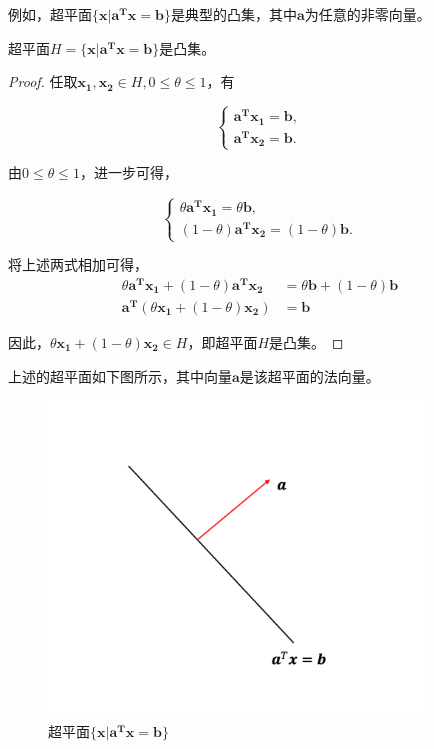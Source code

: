 例如，超平面$\{\bm{x}|\bm{a^{T}}\bm{x}=\bm{b}\}$是典型的凸集，其中$\bm{a}$为任意的非零向量。

\begin{problem}
    超平面$H=\{\bm{x}|\bm{a^{T}}\bm{x}=\bm{b}\}$是凸集。
\end{problem}
\begin{proof}
    任取$\bm{x_{1}}, \bm{x_{2}}\in H, 0 \leq \theta \leq 1$，有
    
    \begin{equation*}
        \begin{cases}
            \bm{a^{T}x_{1}} = \bm{b}, \\
            \bm{a^{T}x_{2}} = \bm{b}.
        \end{cases}
    \end{equation*}

    由$0\leq \theta \leq 1$，进一步可得，
    
    \begin{equation*}
        \begin{cases}
            \theta \bm{a^{T}x_{1}} = \theta \bm{b}, \\
            (1-\theta) \bm{a^{T}x_{2}} = (1-\theta) \bm{b}.
        \end{cases}
    \end{equation*}

    将上述两式相加可得，
    \begin{equation*}
        \begin{split}
            \theta \bm{a^{T}x_{1}} + (1-\theta) \bm{a^{T}x_{2}} &= \theta \bm{b} + (1-\theta) \bm{b} \\
            \bm{a^{T}} (\theta \bm{x_{1}}+(1-\theta)\bm{x_{2}}) &= \bm{b}
        \end{split}
    \end{equation*}

    因此，$\theta \bm{x_{1}}+(1-\theta)\bm{x_{2}} \in H$，即超平面$H$是凸集。
\end{proof}

上述的超平面如下图所示，其中向量$\bm{a}$是该超平面的法向量。
\begin{figure}[hbtp]
    \centering
    \includegraphics[width=100mm]{./Figures/hyperplane_figure.png}
    \caption{超平面$\{\bm{x}|\bm{a^{T}}\bm{x}=\bm{b}\}$}
    \label{figure_xlnx}
\end{figure}

